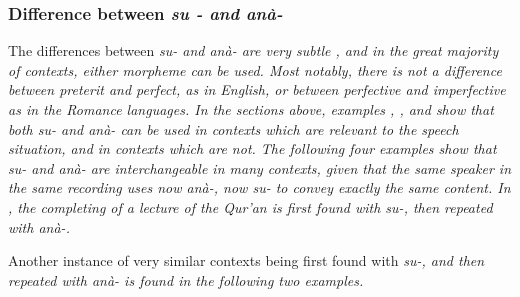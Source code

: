 \subsubsection{Difference between \em su - \em and \em anà- \em}\label{sec:morph:Differencebetweensuandana}
The differences between \em su- \em and \em anà- \em are very subtle \citep[167]{SmithEtAl2006cll}, and in the great majority of contexts, either morpheme can be used. Most notably, there is not a difference between preterit and perfect, as in English, or between perfective and imperfective as in the Romance languages. In the sections above, examples
, ,  and  show that both \em su- \em and \em anà- \em can be used in contexts which are relevant to the speech situation, and in contexts which are not. The following four examples show that \em su- \em and \em anà- \em are interchangeable in many contexts, given that the same speaker in the same recording uses now \em anà-\em, now \em su- \em  to convey exactly the same content. In , the completing of a lecture of the Qur'an is first found with \em su-\em, then repeated with \em anà-\em.


Another instance of very similar contexts being  first found with \em su-\em, and then repeated with \em anà- \em is found in the following two examples.


